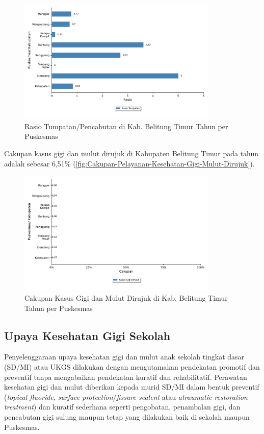 \begin{figure}[H]
	\centering
	    \includegraphics[width=0.85\textwidth]{bab_05/bab_05_27a_gimulTumpatan}
	\caption{Rasio Tumpatan/Pencabutan di Kab. Belitung Timur Tahun \tP per Puskesmas}
	\label{fig:Cakupan-Pelayanan-Kesehatan-Gigi-Mulut-Tumpatan}
\end{figure}

Cakupan kasus gigi dan mulut dirujuk di Kabupaten Belitung Timur pada tahun \tP adalah sebesar 6,51\% (\autoref{fig:Cakupan-Pelayanan-Kesehatan-Gigi-Mulut-Dirujuk}).

\begin{figure}[H]
	\centering
    \includegraphics[width=0.85\textwidth]{bab_05/bab_05_27b_gimulDirujuk}
	\caption{Cakupan Kasus Gigi dan Mulut Dirujuk di Kab. Belitung Timur Tahun \tP per Puskesmas}
	\label{fig:Cakupan-Pelayanan-Kesehatan-Gigi-Mulut-Dirujuk}
\end{figure}

\subsection{Upaya Kesehatan Gigi Sekolah}
Penyelenggaraan upaya kesehatan gigi dan mulut anak sekolah tingkat dasar (SD/MI) atau UKGS dilakukan dengan mengutamakan pendekatan promotif dan preventif tanpa mengabaikan pendekatan kuratif dan rehabilitatif.
Perawatan kesehatan gigi dan mulut diberikan kepada murid SD/MI dalam bentuk preventif (\textit{topical fluoride}, \textit{surface protection}/\textit{fissure sealent} atau \textit{atraumatic restoration treatment}) dan kuratif sederhana seperti pengobatan, penambalan gigi, dan pencabutan gigi sulung maupun tetap yang dilakukan baik di sekolah maupun Puskesmas.

